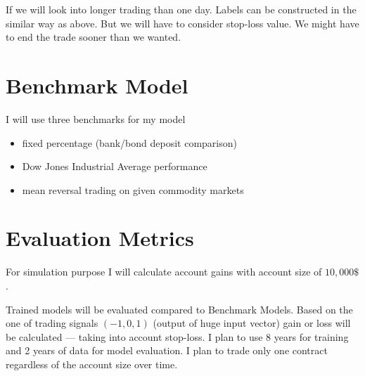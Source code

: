 \documentclass[final,2p]{elsarticle}
\begin{document}
If we will look into longer trading than one day. Labels can be constructed in the similar way as above. But we will have to consider stop-loss value. We might have to end the trade sooner than we wanted.

\section{Benchmark Model}

I will use three benchmarks for my model

\begin{itemize}
    \item fixed percentage (bank/bond deposit comparison)
    \item Dow Jones Industrial Average performance
    \item mean reversal trading on given commodity markets
\end{itemize}

\section{Evaluation Metrics}

For simulation purpose I will calculate account gains with account size of $10,000\$$.

Trained models will be evaluated compared to Benchmark Models. Based on the one of trading signals $(-1,0,1)$ (output of huge input vector) gain or loss will be calculated --- taking into account stop-loss.
I plan to use 8 years for training and 2 years of data for model evaluation. I plan to trade only one contract regardless of the account size over time.
\end{document}
